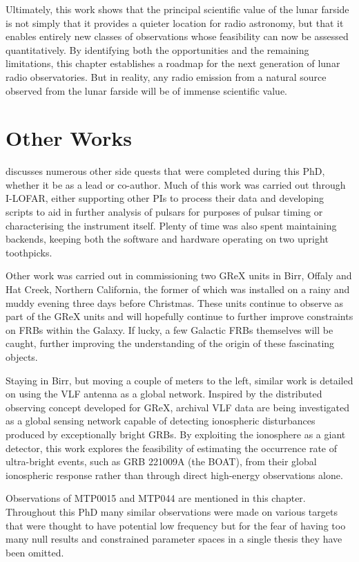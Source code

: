 Ultimately, this work shows that the principal scientific value of the lunar farside is not simply that it provides a quieter location for radio astronomy, but that it enables entirely new classes of observations whose feasibility can now be assessed quantitatively. By identifying both the opportunities and the remaining limitations, this chapter establishes a roadmap for the next generation of lunar radio observatories. But in reality, any radio emission from a natural source observed from the lunar farside will be of immense scientific value. 

\section{Other Works}

 discusses numerous other side quests that were completed during this PhD, whether it be as a lead or co-author. Much of this work was carried out through I-LOFAR, either supporting other PIs to process their data and developing scripts to aid in further analysis of pulsars for purposes of pulsar timing or characterising the instrument itself. Plenty of time was also spent maintaining backends, keeping both the software and hardware operating on two upright toothpicks. 

Other work was carried out in commissioning two GReX units in Birr, Offaly and Hat Creek, Northern California, the former of which was installed on a rainy and muddy evening three days before Christmas. These units continue to observe as part of the GReX units and will hopefully continue to further improve constraints on FRBs within the Galaxy. If lucky, a few Galactic FRBs themselves will be caught, further improving the understanding of the origin of these fascinating objects. 

Staying in Birr, but moving a couple of meters to the left, similar work is detailed on using the VLF antenna as a global network. Inspired by the distributed observing concept developed for GReX, archival VLF data are being investigated as a global sensing network capable of detecting ionospheric disturbances produced by exceptionally bright GRBs. By exploiting the ionosphere as a giant detector, this work explores the feasibility of estimating the occurrence rate of ultra-bright events, such as GRB 221009A (the BOAT), from their global ionospheric response rather than through direct high-energy observations alone.

Observations of MTP0015 and MTP044 are mentioned in this chapter. Throughout this PhD many similar observations were made on various targets that were thought to have potential low frequency but for the fear of having too many null results and constrained parameter spaces in a single thesis they have been omitted. 

